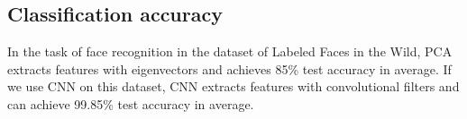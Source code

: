 \subsection{Classification accuracy}
In the task of face recognition in the dataset of Labeled Faces in the Wild,
PCA extracts features with eigenvectors and achieves 85\% test accuracy in average. 
If we use CNN on this dataset, CNN extracts features with convolutional filters and can achieve 99.85\% test accuracy in average. 



